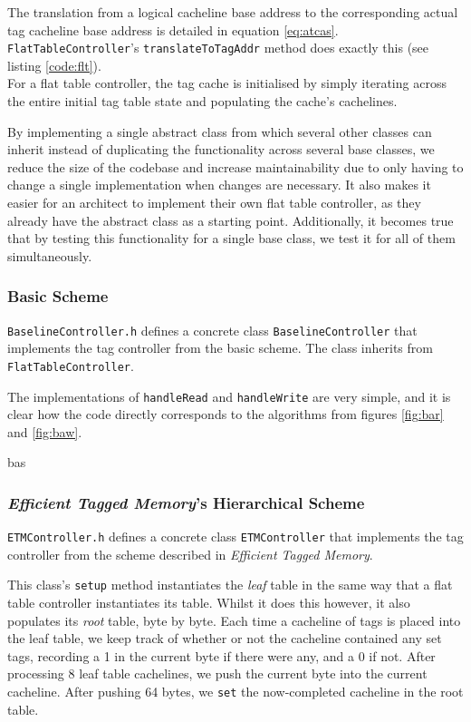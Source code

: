 The translation from a logical cacheline base address to the corresponding actual tag cacheline base address is detailed in equation \ref{eq:atcas}. \texttt{FlatTableController}'s \texttt{translateToTagAddr} method does exactly this (see listing \ref{code:flt}).\\
For a flat table controller, the tag cache is initialised by simply iterating across the entire initial tag table state and populating the cache's cachelines.

By implementing a single abstract class from which several other classes can inherit instead of duplicating the functionality across several base classes, we reduce the size of the codebase and increase maintainability due to only having to change a single implementation when changes are necessary. It also makes it easier for an architect to implement their own flat table controller, as they already have the abstract class as a starting point. Additionally, it becomes true that by testing this functionality for a single base class, we test it for all of them simultaneously.

\subsubsection{Basic Scheme}
\texttt{BaselineController.h} defines a concrete class \texttt{BaselineController} that implements the tag controller from the basic scheme. The class inherits from \texttt{FlatTableController}.

The implementations of \texttt{handleRead} and \texttt{handleWrite} are very simple, and it is clear how the code directly corresponds to the algorithms from figures \ref{fig:bar} and \ref{fig:baw}.

\begin{algorithm}[H]
	\centering
	{bas}
	\caption{\texttt{BaselineController} class}
	\label{code:bas}
\end{algorithm}

\subsubsection{\textit{Efficient Tagged Memory}'s Hierarchical Scheme}
\texttt{ETMController.h} defines a concrete class \texttt{ETMController} that implements the tag controller from the scheme described in \textit{Efficient Tagged Memory}.

This class's \texttt{setup} method instantiates the \textit{leaf} table in the same way that a flat table controller instantiates its table. Whilst it does this however, it also populates its \textit{root} table, byte by byte. Each time a cacheline of tags is placed into the leaf table, we keep track of whether or not the cacheline contained any set tags, recording a 1 in the current byte if there were any, and a 0 if not. After processing 8 leaf table cachelines, we push the current byte into the current cacheline. After pushing 64 bytes, we \texttt{set} the now-completed cacheline in the root table.

